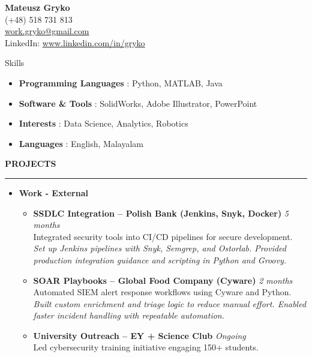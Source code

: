 \documentclass[11pt,letterpaper]{article}
\newcommand{\namesection}[2]{
    \begin{center}
        {\huge \bfseries #1}\\[-1pt]
        \small #2
    \end{center}\vspace{6pt}
}
\newenvironment{sectionheader}[1]{
    \vspace{6pt}\noindent\textbf{\uppercase{#1}}\vspace{1pt}\\[-2pt]
    \hrule height 0.9pt \vspace{3pt}
    \begin{itemize}[leftmargin=1.05em,itemsep=1pt,topsep=0pt]
}{
    \end{itemize}
}
\newenvironment{sectionheader_nobullet}[1]{
    \vspace{6pt}\noindent\textbf{\uppercase{#1}}\vspace{1pt}\\[-2pt]
    \hrule height 0.9pt \vspace{3pt}
    \begin{itemize}[leftmargin=0em,label={},itemsep=1pt,topsep=0pt]
}{
    \end{itemize}
}
\newenvironment{FitOnePage}
{%
  \newsavebox{\resumecontent}%
  \begin{lrbox}{\resumecontent}%
  \begin{minipage}{\textwidth}%
}
{%
  \end{minipage}%
  \end{lrbox}%
  \ifdim\ht\resumecontent>\textheight
    \begin{center}
      \adjustbox{max totalsize={\textwidth}{\textheight},center}{\usebox{\resumecontent}}
    \end{center}
  \else
    \usebox{\resumecontent}%
  \fi
}
\begin{document}
\begin{FitOnePage}\namesection{Mateusz Gryko}{%
(+48) 518 731 813 \\
\href{mailto:work.gryko@gmail.com}{work.gryko@gmail.com} \\
LinkedIn: \href{https://www.linkedin.com/in/gryko}{www.linkedin.com/in/gryko} \\
}
\begin{sectionheader_nobullet}{Skills}
\begin{itemize}[leftmargin=0em,label={},itemsep=0pt,topsep=0pt]
  \item \textbf{ Programming Languages }: Python, MATLAB, Java
  \item \textbf{ Software & Tools }: SolidWorks, Adobe Illustrator, PowerPoint
  \item \textbf{ Interests }: Data Science, Analytics, Robotics
  \item \textbf{ Languages }: English, Malayalam
\end{itemize}
\end{sectionheader_nobullet}\begin{sectionheader}{Projects}
  \item \textbf{ Work - External }
  \begin{itemize}[leftmargin=1em,itemsep=1pt,topsep=1pt]
      \item \textbf{ SSDLC Integration – Polish Bank (Jenkins, Snyk, Docker) } \hfill {\emph{ 5 months }} \\
            {\small Integrated security tools into CI/CD pipelines for secure development.} \\[-2pt]
            {\footnotesize \emph{ Set up Jenkins pipelines with Snyk, Semgrep, and Ostorlab. Provided production integration guidance and scripting in Python and Groovy. }}
      \item \textbf{ SOAR Playbooks – Global Food Company (Cyware) } \hfill {\emph{ 2 months }} \\
            {\small Automated SIEM alert response workflows using Cyware and Python.} \\[-2pt]
            {\footnotesize \emph{ Built custom enrichment and triage logic to reduce manual effort. Enabled faster incident handling with repeatable automation. }}
      \item \textbf{ University Outreach – EY + Science Club } \hfill {\emph{ Ongoing }} \\
            {\small Led cybersecurity training initiative engaging 150+ students.} \\[-2pt]

\end{itemize}
\end{sectionheader}
\end{FitOnePage}
\end{document}
